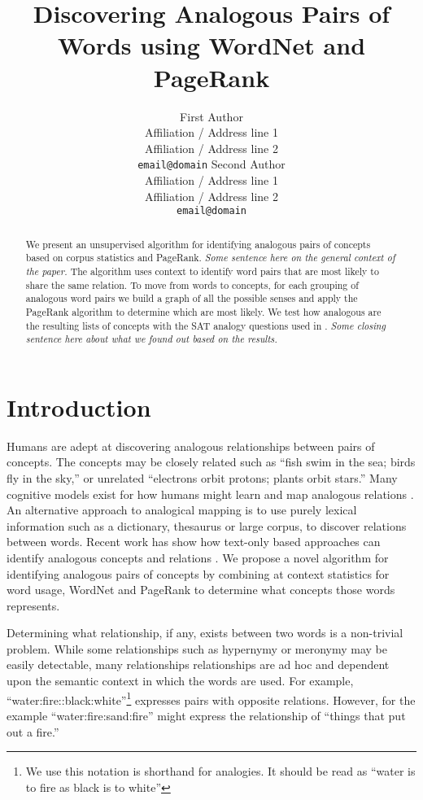 \documentclass[11pt]{article}
\title{Discovering Analogous Pairs of Words using WordNet and PageRank}
\author{First Author\\
  Affiliation / Address line 1\\
  Affiliation / Address line 2\\
  {\tt email@domain}  \And
  Second Author\\
  Affiliation / Address line 1\\
  Affiliation / Address line 2\\
  {\tt  email@domain}}
\date{}
\begin{document}
\maketitle

\begin{abstract}

We present an unsupervised algorithm for identifying analogous pairs of concepts
based on corpus statistics and PageRank.  \emph{Some sentence here on the
  general context of the paper.} The algorithm uses context to identify word
pairs that are most likely to share the same relation.  To move from words to
concepts, for each grouping of analogous word pairs we build a graph of all the
possible senses and apply the PageRank algorithm to determine which are most
likely.  We test how analogous are the resulting lists of concepts with the SAT
analogy questions used in \cite{turney03combining}.  \emph{Some closing sentence
  here about what we found out based on the results.}


\end{abstract}

\section{Introduction}

Humans are adept at discovering analogous relationships between pairs of
concepts.  The concepts may be closely related such as ``fish swim in the sea;
birds fly in the sky,'' or unrelated ``electrons orbit protons; plants orbit
stars.''  Many cognitive models exist for how humans might learn and map
analogous relations \cite{french02computational}.  An alternative approach to
analogical mapping is to use purely lexical information such as a dictionary,
thesaurus or large corpus, to discover relations between words.  Recent work has
show how text-only based approaches can identify analogous concepts
\cite{nakov06using,speer08analogyspace} and relations
\cite{mangalath04analogy,turney05corpus,bicici06clustering,veale04wordnet}.  We
propose a novel algorithm for identifying analogous pairs of concepts by
combining at context statistics for word usage, WordNet \cite{fellbaum98wordnet}
and PageRank \cite{brin98anatomy} to determine what concepts those words
represents.

Determining what relationship, if any, exists between two words is a non-trivial
problem.  While some relationships such as hypernymy or meronymy may be easily
detectable, many relationships relationships are ad hoc and dependent upon the
semantic context in which the words are used.  For example,
``water:fire::black:white''\footnote{We use this notation is shorthand for
  analogies.  It should be read as ``water is to fire as black is to white''}
expresses pairs with opposite relations.  However, for the example
``water:fire:sand:fire'' might express the relationship of ``things
that put out a fire.''  
\end{document}
